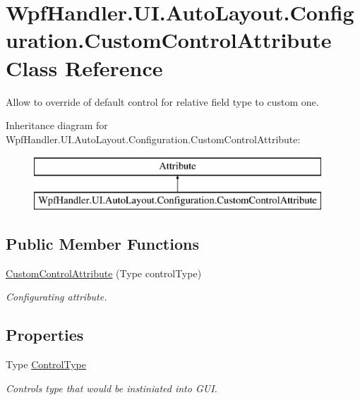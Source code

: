 \hypertarget{class_wpf_handler_1_1_u_i_1_1_auto_layout_1_1_configuration_1_1_custom_control_attribute}{}\section{Wpf\+Handler.\+U\+I.\+Auto\+Layout.\+Configuration.\+Custom\+Control\+Attribute Class Reference}
\label{class_wpf_handler_1_1_u_i_1_1_auto_layout_1_1_configuration_1_1_custom_control_attribute}


Allow to override of default control for relative field type to custom one.  


Inheritance diagram for Wpf\+Handler.\+U\+I.\+Auto\+Layout.\+Configuration.\+Custom\+Control\+Attribute\+:\begin{figure}[H]
\begin{center}
\leavevmode
\includegraphics[height=2.000000cm]{d1/de8/class_wpf_handler_1_1_u_i_1_1_auto_layout_1_1_configuration_1_1_custom_control_attribute}
\end{center}
\end{figure}
\subsection*{Public Member Functions}
\begin{DoxyCompactItemize}
\item 
\mbox{\hyperlink{class_wpf_handler_1_1_u_i_1_1_auto_layout_1_1_configuration_1_1_custom_control_attribute_a7a46691a6fae1c36fb9812923e90cf8a}{Custom\+Control\+Attribute}} (Type control\+Type)
\begin{DoxyCompactList}\small\item\em Configurating attribute. \end{DoxyCompactList}\end{DoxyCompactItemize}
\subsection*{Properties}
\begin{DoxyCompactItemize}
\item 
Type \mbox{\hyperlink{class_wpf_handler_1_1_u_i_1_1_auto_layout_1_1_configuration_1_1_custom_control_attribute_a71f151123c78381231004ac155570be0}{Control\+Type}}
\begin{DoxyCompactList}\small\item\em Control\textquotesingle{}s type that would be instiniated into G\+UI. \end{DoxyCompactList}\end{DoxyCompactItemize}
